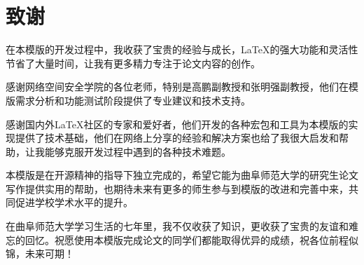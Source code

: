 \section*{致谢}

在本模版的开发过程中，我收获了宝贵的经验与成长，\LaTeX{}的强大功能和灵活性节省了大量时间，让我有更多精力专注于论文内容的创作。

感谢网络空间安全学院的各位老师，特别是高鹏副教授和张明强副教授，他们在模版需求分析和功能测试阶段提供了专业建议和技术支持。

感谢国内外\LaTeX{}社区的专家和爱好者，他们开发的各种宏包和工具为本模版的实现提供了技术基础，他们在网络上分享的经验和解决方案也给了我很大启发和帮助，让我能够克服开发过程中遇到的各种技术难题。

本模版是在开源精神的指导下独立完成的，希望它能为曲阜师范大学的研究生论文写作提供实用的帮助，也期待未来有更多的师生参与到模版的改进和完善中来，共同促进学校学术水平的提升。

在曲阜师范大学学习生活的七年里，我不仅收获了知识，更收获了宝贵的友谊和难忘的回忆。祝愿使用本模版完成论文的同学们都能取得优异的成绩，祝各位前程似锦，未来可期！
